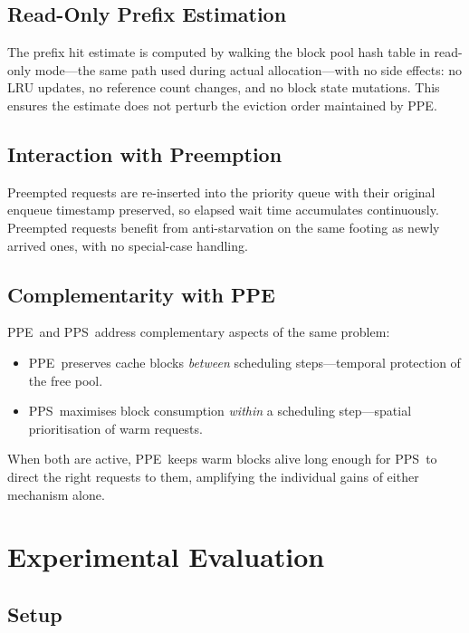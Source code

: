 \documentclass[journal]{IEEEtran}
\newcommand{\ppe}{\textsc{PPE}}
\newcommand{\pps}{\textsc{PPS}}
\begin{document}
\subsection{Read-Only Prefix Estimation}

The prefix hit estimate is computed by walking the block pool hash table in
read-only mode—the same path used during actual allocation—with no side
effects: no LRU updates, no reference count changes, and no block state
mutations.  This ensures the estimate does not perturb the eviction order
maintained by \ppe.

\subsection{Interaction with Preemption}

Preempted requests are re-inserted into the priority queue with their
original enqueue timestamp preserved, so elapsed wait time accumulates
continuously.  Preempted requests benefit from anti-starvation on the same
footing as newly arrived ones, with no special-case handling.

\subsection{Complementarity with \ppe}

\ppe\ and \pps\ address complementary aspects of the same problem:
\begin{itemize}
\item \ppe\ preserves cache blocks \emph{between} scheduling steps—temporal
      protection of the free pool.
\item \pps\ maximises block consumption \emph{within} a scheduling step—spatial
      prioritisation of warm requests.
\end{itemize}
When both are active, \ppe\ keeps warm blocks alive long enough for \pps\ to
direct the right requests to them, amplifying the individual gains of either
mechanism alone.

\section{Experimental Evaluation}
\label{sec:eval}

\subsection{Setup}
\end{document}
